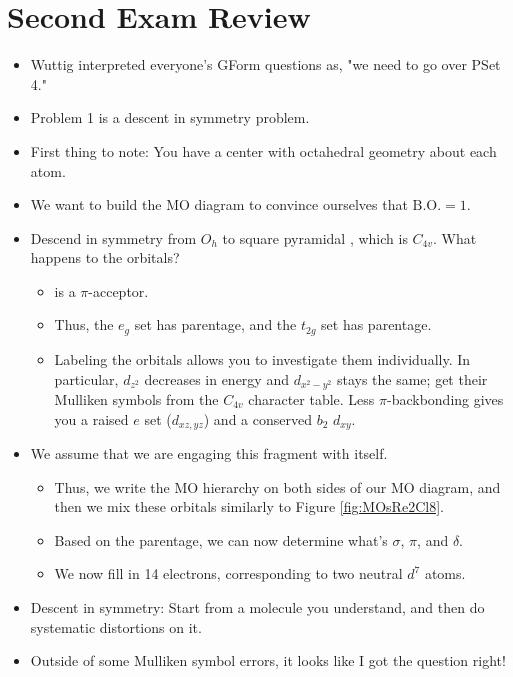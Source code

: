 \documentclass[../notes.tex]{subfiles}
\begin{document}
\section{Second Exam Review}
\begin{itemize}
    \item {}Wuttig interpreted everyone's GForm questions as, "we need to go over PSet 4."
    \item Problem 1 is a descent in symmetry problem.
    \item First thing to note: You have a  center with octahedral geometry about each  atom.
    \item We want to build the MO diagram to convince ourselves that $\text{B.O.}=1$.
    \item Descend in symmetry from  $O_h$ to square pyramidal , which is $C_{4v}$. What happens to the orbitals?
    \begin{itemize}
        \item {} is a $\pi$-acceptor.
        \item Thus, the $e_g$ set has  parentage, and the $t_{2g}$ set has  parentage.
        \item Labeling the orbitals allows you to investigate them individually. In particular, $d_{z^2}$ decreases in energy and $d_{x^2-y^2}$ stays the same; get their Mulliken symbols from the $C_{4v}$ character table. Less $\pi$-backbonding gives you a raised $e$ set ($d_{xz,yz}$) and a conserved $b_2$ $d_{xy}$.
    \end{itemize}
    \item We assume that we are engaging this fragment with itself.
    \begin{itemize}
        \item Thus, we write the MO hierarchy on both sides of our MO diagram, and then we mix these orbitals similarly to Figure \ref{fig:MOsRe2Cl8}.
        \item Based on the parentage, we can now determine what's $\sigma$, $\pi$, and $\delta$.
        \item We now fill in 14 electrons, corresponding to two neutral $d^7$  atoms.
    \end{itemize}
    \item Descent in symmetry: Start from a molecule you understand, and then do systematic distortions on it.
    \item Outside of some Mulliken symbol errors, it looks like I got the question right!

\end{itemize}
\end{document}
